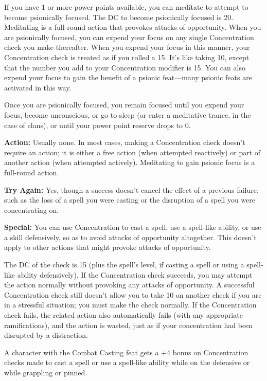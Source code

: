If you have 1 or more power points available, you can meditate to attempt to become psionically focused. The DC to become psionically focused is 20. Meditating is a full-round action that provokes attacks of opportunity. When you are psionically focused, you can expend your focus on any single Concentration check you make thereafter. When you expend your focus in this manner, your Concentration check is treated as if you rolled a 15. It’s like taking 10, except that the number you add to your Concentration modifier is 15. You can also expend your focus to gain the benefit of a psionic feat---many psionic feats are activated in this way.

Once you are psionically focused, you remain focused until you expend your focus, become unconscious, or go to sleep (or enter a meditative trance, in the case of elans), or until your power point reserve drops to 0.

\textbf{Action:} Usually none. In most cases, making a Concentration check doesn’t require an action; it is either a free action (when attempted reactively) or part of another action (when attempted actively). Meditating to gain psionic focus is a full-round action.

\textbf{Try Again:} Yes, though a success doesn’t cancel the effect of a previous failure, such as the loss of a spell you were casting or the disruption of a spell you were concentrating on.

\textbf{Special:} You can use Concentration to cast a spell, use a spell-like ability, or use a skill defensively, so as to avoid attacks of opportunity altogether. This doesn’t apply to other actions that might provoke attacks of opportunity.

The DC of the check is 15 (plus the spell’s level, if casting a spell or using a spell-like ability defensively). If the Concentration check succeeds, you may attempt the action normally without provoking any attacks of opportunity. A successful Concentration check still doesn’t allow you to take 10 on another check if you are in a stressful situation; you must make the check normally. If the Concentration check fails, the related action also automatically fails (with any appropriate ramifications), and the action is wasted, just as if your concentration had been disrupted by a distraction.

A character with the Combat Casting feat gets a +4 bonus on Concentration checks made to cast a spell or use a spell-like ability while on the defensive or while grappling or pinned.

